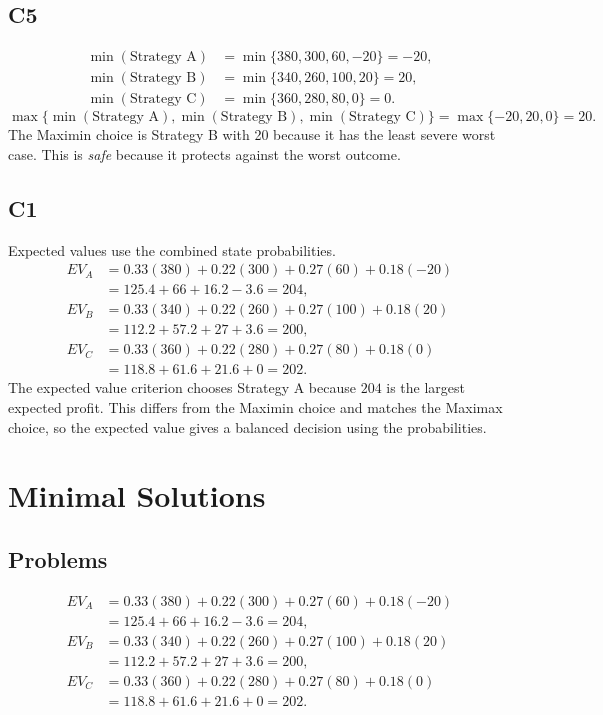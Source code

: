 \begin{ExamProblems}
		\subsection*{C5}
		\[
		\begin{aligned}
		\min(\text{Strategy A}) &= \min\{380,300,60,-20\} = -20,\\
		\min(\text{Strategy B}) &= \min\{340,260,100,20\} = 20,\\
		\min(\text{Strategy C}) &= \min\{360,280,80,0\} = 0.
		\end{aligned}
		\]
		\[
		\max\{\min(\text{Strategy A}), \min(\text{Strategy B}), \min(\text{Strategy C})\}
		= \max\{-20, 20, 0\}
		= 20.
		\]
		The Maximin choice is Strategy B with 20 because it has the least severe worst case. This is \emph{safe} because it protects against the worst outcome.

		\subsection*{C1}
		Expected values use the combined state probabilities.
		\[
		\begin{aligned}
		EV_A &= 0.33(380)+0.22(300)+0.27(60)+0.18(-20)\\
		&= 125.4+66+16.2-3.6=204,\\
		EV_B &= 0.33(340)+0.22(260)+0.27(100)+0.18(20)\\
		&= 112.2+57.2+27+3.6=200,\\
		EV_C &= 0.33(360)+0.22(280)+0.27(80)+0.18(0)\\
		&= 118.8+61.6+21.6+0=202.
		\end{aligned}
		\]
		The expected value criterion chooses Strategy A because $204$ is the largest expected profit. This differs from the Maximin choice and matches the Maximax choice, so the expected value gives a balanced decision using the probabilities.
	\end{ExamProblems}


\section{Minimal Solutions}

\subsection*{Problems}
\[\begin{aligned}
		EV_A &= 0.33(380)+0.22(300)+0.27(60)+0.18(-20)\\
		&= 125.4+66+16.2-3.6=204,\\
		EV_B &= 0.33(340)+0.22(260)+0.27(100)+0.18(20)\\
		&= 112.2+57.2+27+3.6=200,\\
		EV_C &= 0.33(360)+0.22(280)+0.27(80)+0.18(0)\\
		&= 118.8+61.6+21.6+0=202.
		\end{aligned}\]


